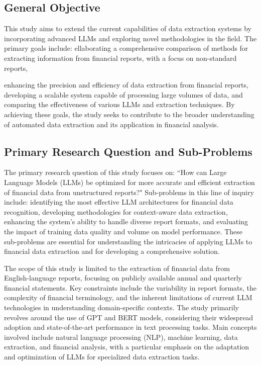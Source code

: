 \documentclass[english, 12pt, a4paper, elec, utf8, a-2b, online]{aaltothesis}
\begin{document}
\subsection{General Objective}

This study aims to extend the current capabilities of data extraction systems by incorporating advanced \ac{LLMs} and exploring novel methodologies in the field.
The primary goals include: ellaborating a comprehensive comparison of methods for extracting information from financial reports, with a focus on non-standard reports,

enhancing the precision and efficiency of data extraction from financial reports, developing a scalable system capable of processing large volumes of data, and comparing the effectiveness of various LLMs and extraction techniques. By achieving these goals, the study seeks to contribute to the broader understanding of automated data extraction and its application in financial analysis.

\subsection{Primary Research Question and Sub-Problems}

The primary research question of this study focuses on: ``How can Large Language Models (LLMs) be optimized for more accurate and efficient extraction of financial data from unstructured reports?" Sub-problems in this line of inquiry include: identifying the most effective LLM architectures for financial data recognition, developing methodologies for context-aware data extraction, enhancing the system's ability to handle diverse report formats, and evaluating the impact of training data quality and volume on model performance. These sub-problems are essential for understanding the intricacies of applying LLMs to financial data extraction and for developing a comprehensive solution.


The scope of this study is limited to the extraction of financial data from English-language reports, focusing on publicly available annual and quarterly financial statements. Key constraints include the variability in report formats, the complexity of financial terminology, and the inherent limitations of current LLM technologies in understanding domain-specific contexts. The study primarily revolves around the use of GPT and BERT models, considering their widespread adoption and state-of-the-art performance in text processing tasks. Main concepts involved include natural language processing (NLP), machine learning, data extraction, and financial analysis, with a particular emphasis on the adaptation and optimization of LLMs for specialized data extraction tasks.
\end{document}
